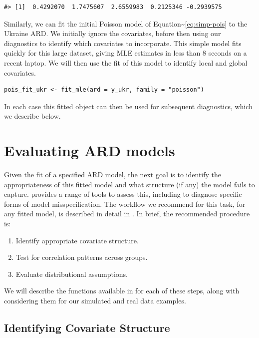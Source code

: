 \begin{verbatim}
#> [1]  0.4292070  1.7475607  2.6559983  0.2125346 -0.2939575
\end{verbatim}

Similarly, we can fit the initial Poisson model of Equation\textasciitilde\eqref{eq:simp-pois}
to the Ukraine ARD. We initially ignore the covariates, before then
using our diagnostics to identify which covariates to incorporate.
This simple model fits quickly for this large dataset, giving MLE estimates
in less than 8 seconds on a recent laptop. We will then use the
fit of this model to identify local and global covariates.

\begin{verbatim}
pois_fit_ukr <- fit_mle(ard = y_ukr, family = "poisson")
\end{verbatim}

In each case this fitted object can then be used for subsequent
diagnostics, which we describe below.

\hypertarget{sec:eval}{%
\section{Evaluating ARD models}\label{sec:eval}}

Given the fit of a specified ARD model, the next goal is to identify
the appropriateness of this fitted model and what structure (if any)
the model fails to capture.  provides a range
of tools to assess this, including to diagnose specific forms
of model misspecification.
The workflow we recommend for this task, for any fitted model, is
described in detail in \citep{laga2026evaluating}. In brief, the recommended
procedure is:

\begin{enumerate}
\def\labelenumi{\arabic{enumi}.}
\tightlist
\item
  Identify appropriate covariate structure.
\item
  Test for correlation patterns across groups.
\item
  Evaluate distributional assumptions.
\end{enumerate}

We will describe the functions available in 
for each of these steps, along with considering them for
our simulated and real data examples.

\hypertarget{identifying-covariate-structure}{%
\subsection{Identifying Covariate Structure}\label{identifying-covariate-structure}}

